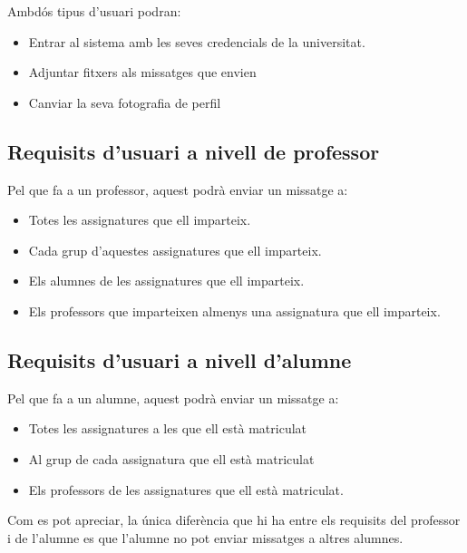 Ambdós tipus d'usuari podran:
\begin{itemize}
	\item Entrar al sistema amb les seves credencials de la universitat. 
	\item Adjuntar fitxers als missatges que envien
	\item Canviar la seva fotografia de perfil
\end{itemize}

\subsection{Requisits d'usuari a nivell de professor}
Pel que fa a un professor, aquest podrà enviar un missatge a:
\begin{itemize}
	\item Totes les assignatures que ell imparteix.
	\item Cada grup d'aquestes assignatures que ell imparteix.
	\item Els alumnes de les assignatures que ell imparteix.
	\item Els professors que imparteixen almenys una assignatura que ell imparteix.
\end{itemize}

\subsection{Requisits d'usuari a nivell d'alumne}

Pel que fa a un alumne, aquest podrà enviar un missatge a:
\begin{itemize}
	\item Totes les assignatures a les que ell està matriculat
	\item Al grup de cada assignatura que ell està matriculat
	\item Els professors de les assignatures que ell està matriculat.
\end{itemize}

Com es pot apreciar, la única diferència que hi ha entre els requisits del professor i de l'alumne es que l'alumne no pot enviar missatges a altres alumnes.

